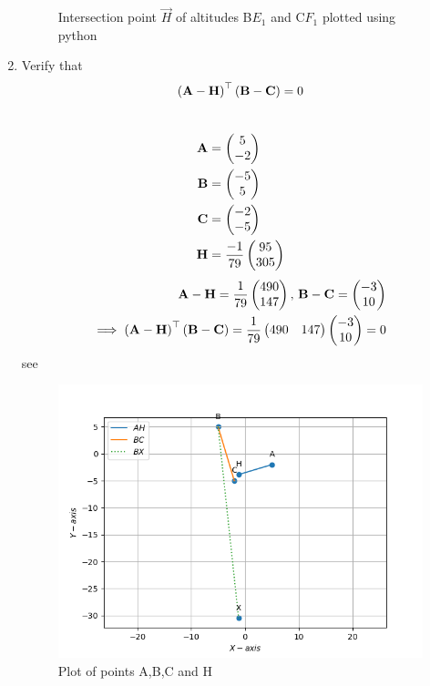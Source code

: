\documentclass[11pt]{book}
\begin{document}
\begin{enumerate}[label=\thesection.\arabic*.,ref=\thesection.\theenumi]
\begin{figure}[H]
\caption{Intersection point $\vec{H}$ of altitudes B$E_{1}$ and C$F_{1}$ plotted using python}
\label{fig:m_tri_py}
\end{figure}

\item Verify that 
		\begin{align}
			\left(\mathbf{A}-\mathbf{H}\right)^{\top}\left(\mathbf{B}-\mathbf{C}\right) = 0
		\end{align}
\\  \solution
 \begin{align} 
 \mathbf{A} &= \begin{pmatrix} 5\\ -2 \end{pmatrix} \\ \mathbf{B} &= \begin{pmatrix} -5\\ 5 \end{pmatrix}
  \\\mathbf{C} &= \begin{pmatrix} -2\\ -5\end{pmatrix} \\ \mathbf{H} &=\frac{-1}{79}\begin{pmatrix}{95}\\{305}\end{pmatrix}
 \end{align}
\begin{align}
\mathbf{A}-\mathbf{H}=\frac{1}{79}\begin{pmatrix}{490}\\{147}\end{pmatrix},\,
\mathbf{B}-\mathbf{C}=\begin{pmatrix}-3\\10\end{pmatrix}
\\
	\implies \left(\mathbf{A}-\mathbf{H}\right)^{\top}\left(\mathbf{B}-\mathbf{C}\right)=\frac{1}{79}\begin{pmatrix}490 & 147\end{pmatrix}
\begin{pmatrix}-3\\10\end{pmatrix}
=0
\end{align}
see 
\begin{figure}
    \centering
    \includegraphics[width=\columnwidth]{figs/AHBC_verify.png}
    \caption{Plot of points A,B,C and H}
    \label{fig:Pts_ABCH}
\end{figure}



\end{enumerate}
\end{document}
